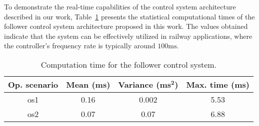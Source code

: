 \begin{comment}
		Infine all'istante di tempo $1700\unit{\second}$ è stato simulato il caso in cui i due treni perdano la comunicazione, questo è possibile vederlo in Figura\tildeAdd\ref{fig:os2_e} dove gli eventi di ricezione si susseguono a distanza temporale ampia provocando alla safety barrier di diventerà positiva anche in questo caso come nello scenario precedente a causa del blocco leader \gls{rlp} predictor, facendo scattare il controllore di emergenza $K_\mathrm{text}$. Difatti la brusca frenata è possibile vederla in Figura\tildeAdd\ref{fig:os2_f} dove una grande forza negativa è attuata dal control input da parte del controllore di emergenza $K_{\mathrm{E}^\mathrm{F}}$ che in Figura\tildeAdd\ref{fig:os2_d} risulta attivato.
		
		Una volta ristabilita la connessione con il leader, grazie all'arrivo del nuovo data packet il sistema di controllo ricalcolando la safety barrier verifica che in realtà il treno si trova in sicurezza e riattiva il controllore $K_{3}^\mathrm{F}$ per cercare lentamebte di recuperare lo spazio perso durante la frenata di emergenza.
		
		
	\end{comment}
	
	
	
	To demonstrate the real-time capabilities of the control system architecture described in our work, Table~\ref{tab:computationController} presents the statistical computational times of the follower control system architecture proposed in this work. The values obtained indicate that the system can be effectively utilized in railway applications, where the controller's frequency rate is typically around $100\unit{\milli\second}$.
	
	
	\begin{table}[!h]
		\begin{center}
			\caption{Computation time for the follower control system.}
			\label{tab:computationController}
			\begin{tabular}{ |c|c|c|c| } 
				\hline
				\textbf{Op. scenario} & \textbf{Mean ($\mathbf{\unit{\milli\second}}$)} & \textbf{Variance ($\mathbf{\unit{\milli\second}^2}$)} & \textbf{Max. time ($\mathbf{\unit{\milli\second}}$)} \\
				\hline
				\gls{os}1	& 0.16 	& 0.002
				& 5.53 \\  
				\gls{os}2	& 0.07	& 0.07
				& 6.88 \\ 
				\hline
			\end{tabular}
		\end{center}
	\end{table}
		

